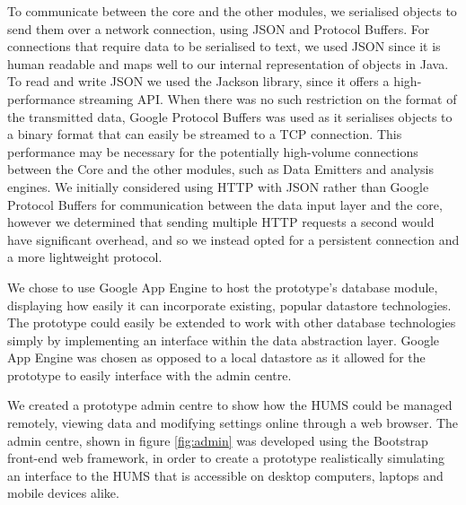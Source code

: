 \documentclass[10pt,a4paper]{article}
\begin{document}
To communicate between the core and the other modules, we serialised 
objects to send them over a network connection, using JSON and 
Protocol Buffers. For connections that require data to be serialised to text, 
we used JSON since it is human readable and maps well to our internal 
representation of objects in Java. To read and write JSON we used the 
Jackson library, since it offers a high-performance streaming API. When 
there was no such restriction on the format of the transmitted data, 
Google Protocol Buffers was used as it serialises objects to a binary format
that can easily be streamed to a TCP connection.
This performance may be necessary for the potentially 
high-volume connections between the Core and the other modules, 
such as Data Emitters and analysis engines. We initially considered 
using HTTP with JSON rather than Google Protocol Buffers for communication 
between the data input layer and the core, however we determined
that sending multiple HTTP requests a second would have significant 
overhead, and so we instead opted for a persistent connection and a 
more lightweight protocol.

We chose to use Google App Engine to host the prototype's database
module, displaying how easily it can incorporate existing, popular
datastore technologies. The prototype could easily be extended to
work with other database technologies simply by implementing an
interface within the data abstraction layer. Google App Engine was chosen
as opposed to a local datastore as it allowed for the prototype to
easily interface with the admin centre.

We created a prototype admin centre to show how the HUMS could be
managed remotely, viewing data and modifying settings online through
a web browser. The admin centre, shown in figure \ref{fig:admin} was
developed using the Bootstrap front-end web framework, in order to create
a prototype realistically simulating an interface to the HUMS that is accessible
on desktop computers, laptops and mobile devices alike.
\end{document}
